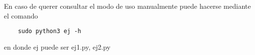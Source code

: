 En caso de querer consultar el modo de uso manualmente puede hacerse mediante el comando
\begin{verbatim}
    sudo python3 ej -h
\end{verbatim}
en donde ej puede ser {ej1.py, ej2.py}
%

\newpage
